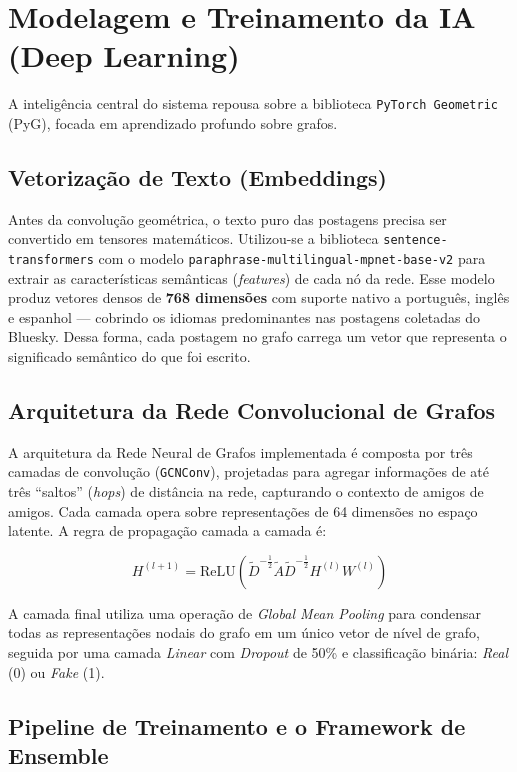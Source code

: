 \section{Modelagem e Treinamento da IA (Deep Learning)}

A inteligência central do sistema repousa sobre a biblioteca \texttt{PyTorch Geometric} (PyG), focada em aprendizado profundo sobre grafos.

\subsection{Vetorização de Texto (Embeddings)}

Antes da convolução geométrica, o texto puro das postagens precisa ser convertido em tensores matemáticos. Utilizou-se a biblioteca \texttt{sentence-transformers} com o modelo \texttt{paraphrase-multilingual-mpnet-base-v2} para extrair as características semânticas (\textit{features}) de cada nó da rede. Esse modelo produz vetores densos de \textbf{768 dimensões} com suporte nativo a português, inglês e espanhol --- cobrindo os idiomas predominantes nas postagens coletadas do Bluesky. Dessa forma, cada postagem no grafo carrega um vetor que representa o significado semântico do que foi escrito.

\subsection{Arquitetura da Rede Convolucional de Grafos}

A arquitetura da Rede Neural de Grafos implementada é composta por três camadas de convolução (\texttt{GCNConv}), projetadas para agregar informações de até três ``saltos'' (\textit{hops}) de distância na rede, capturando o contexto de amigos de amigos. Cada camada opera sobre representações de 64 dimensões no espaço latente. A regra de propagação camada a camada é:

\begin{equation}
H^{(l+1)} = \text{ReLU}\left(\tilde{D}^{-\frac{1}{2}} \tilde{A} \tilde{D}^{-\frac{1}{2}} H^{(l)} W^{(l)}\right)
\end{equation}

A camada final utiliza uma operação de \textit{Global Mean Pooling} para condensar todas as representações nodais do grafo em um único vetor de nível de grafo, seguida por uma camada \textit{Linear} com \textit{Dropout} de 50\% e classificação binária: \textit{Real} (0) ou \textit{Fake} (1).

\subsection{Pipeline de Treinamento e o Framework de Ensemble}

